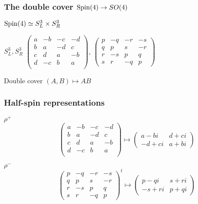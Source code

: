 \documentclass{beamer}
\def\Spin{{\rm Spin}}
\begin{document}
\begin{frame}
	\frametitle{The double cover $\Spin(4) \rightarrow SO(4)$}
	\begin{block}{$\Spin(4) \simeq S^3_L \times S^3_R$}
	\end{block}
	\begin{block}{$S^3_L, S^3_R$}
$\left(
\begin{array}{cccc}
a & -b & -c & -d \\
b & a & -d & c \\
c & d & a & -b \\
d & -c & b & a \\
\end{array}
\right)$, $\left(
\begin{array}{cccc}
p & -q & -r & -s \\
q & p & s & -r \\
r & -s & p & q \\
s & r & -q & p
\end{array}
\right)$	
	\end{block}
	\begin{block}{Double cover}
	$(A,B) \mapsto AB$
	\end{block}
\end{frame}

\begin{frame}
\frametitle{Half-spin representations}
\begin{block}{$\rho^+$}
\[
\left(
\begin{array}{cccc}
a & -b & -c & -d \\
b & a & -d & c \\
c & d & a & -b \\
d & -c & b & a \\
\end{array}
\right)
\mapsto
\left(
\begin{array}{cc}
a -bi & d + ci \\
-d + ci & a + bi
\end{array}
\right)
\]
\end{block}

\begin{block}{$\rho^-$}
\[
\left(
\begin{array}{cccc}
p & -q & -r & -s \\
q & p & s & -r \\
r & -s & p & q \\
s & r & -q & p
\end{array}
\right)^{t}
\mapsto
\left(
\begin{array}{cc}
p - qi & s + ri \\
-s + ri & p + qi
\end{array}
\right)
\]
\end{block}
\end{frame}
\end{document}
